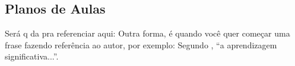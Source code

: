 \begin{apendices}
	\chapter{Planos de Aulas}
	Será q da pra referenciar aqui: Outra forma, é quando você quer começar uma frase fazendo referência ao autor, por exemplo: Segundo , ``a aprendizagem significativa...''.
	
	
\end{apendices}